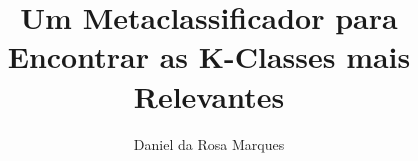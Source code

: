 \documentclass[
  msc
]{ThesisPUC}
\author{Daniel da Rosa Marques}
\title{Um Metaclassificador para Encontrar as K-Classes mais Relevantes}
\begin{document}
  
  
  
  
  
  

  \arial
  \renewcommand{\bibname}{Referências bibliográficas}%
  
\end{document}

